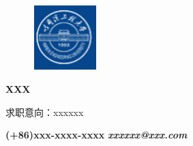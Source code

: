 \documentclass[UTF8,AutoFakeBold]{resume}
\begin{document}
    \begin{figure}[h]
        \flushright
        \includegraphics[height=2.5cm,width=2.5cm]{heu.png}
    \end{figure}
\vspace{-0.175\linewidth}
\begin{center}
        \centering
        \LARGE\fangsong\textbf{XXX} 
\end{center}
\centering\fangsong\normalsize{求职意向：xxxxxx}
\par
\begin{center}
\hspace{0.25em}{\small{\textbullet}}\hspace{0.25em}
	\faPhone \hspace{0.25em}\textbf{(+86)xxx-xxxx-xxxx}
\hspace{0.25em}{\small{\textbullet}}\hspace{0.25em}
\faEnvelope \hspace{0.25em}\textbf{\textit{xxxxxx@xxx.com}}
\end{center}
\end{document}
